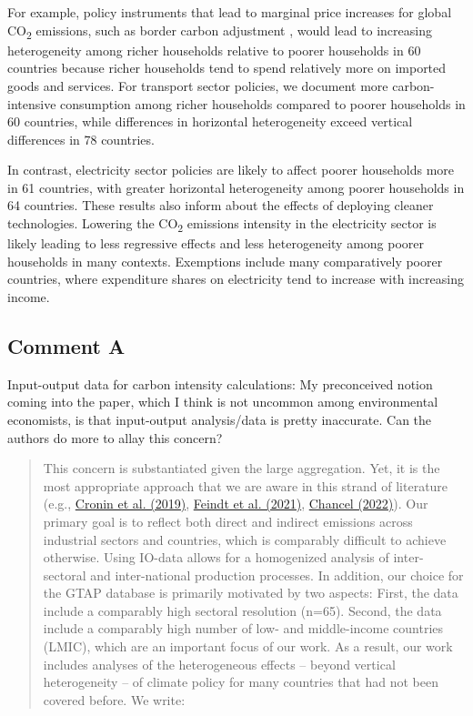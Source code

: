 \documentclass[11pt]{article}
\newenvironment{response}
{\begin{quote}\color{black}}
{\end{quote}}
\begin{document}
\begin{revisionbox}
    For example, policy instruments that lead to marginal price increases for global CO\textsubscript{2} emissions, such as border carbon adjustment \autocite[e.g.,][]{Mehling.2019,Cosbey.2019}, would lead to increasing heterogeneity among richer households relative to poorer households in 60 countries because richer households tend to spend relatively more on imported goods and services. For transport sector policies, we document more carbon-intensive consumption among richer households compared to poorer households in 60 countries, while differences in horizontal heterogeneity exceed vertical differences in 78 countries. 

    In contrast, electricity sector policies are likely to affect poorer households more in 61 countries, with greater horizontal heterogeneity among poorer households in 64 countries. These results also inform about the effects of deploying cleaner technologies. Lowering the CO\textsubscript{2} emissions intensity in the electricity sector is likely leading to less regressive effects and less heterogeneity among poorer households in many contexts. Exemptions include many comparatively poorer countries, where expenditure shares on electricity tend to increase with increasing income. 
\end{revisionbox}

\subsection*{Comment A}\label{comment_R1_A}

\begin{commentbox}
    Input-output data for carbon intensity calculations: My preconceived notion coming into the paper, which I think is not uncommon among environmental economists, is that input-output analysis/data is pretty inaccurate. Can the authors do more to allay this concern?
\end{commentbox}

\begin{response}
    This concern is substantiated given the large aggregation. Yet, it is the most appropriate approach that we are aware in this strand of literature (e.g., \href{https://doi.org/10.1086/701191}{Cronin et al. (2019)}, \href{https://doi.org/10.1016/j.eneco.2021.105550}{Feindt et al. (2021)}, \href{https://doi.org/10.1038/s41893-022-00955-z}{Chancel (2022)}). Our primary goal is to reflect both direct and indirect emissions across industrial sectors and countries, which is comparably difficult to achieve otherwise. Using IO-data allows for a homogenized analysis of inter-sectoral and inter-national production processes. In addition, our choice for the GTAP database is primarily motivated by two aspects: First, the data include a comparably high sectoral resolution (n=65). Second, the data include a comparably high number of low- and middle-income countries (LMIC), which are an important focus of our work. As a result, our work includes analyses of the heterogeneous effects -- beyond vertical heterogeneity -- of climate policy for many countries that had not been covered before. We write:

    \end{response}
\end{document}
